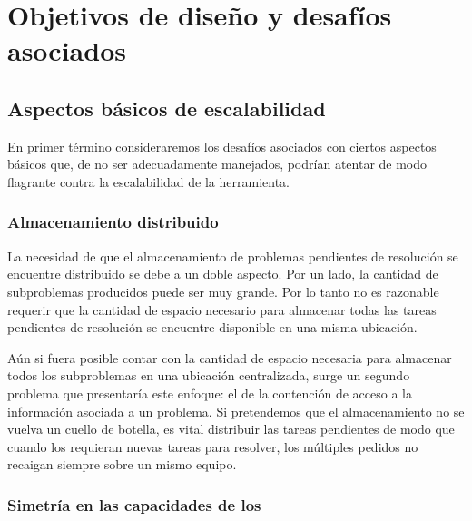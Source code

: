

\section{Objetivos de diseño y desafíos asociados}

\subsection{Aspectos básicos de escalabilidad}

En primer término consideraremos los desafíos asociados con ciertos aspectos
básicos que, de no ser adecuadamente manejados, podrían atentar de modo flagrante
contra la escalabilidad de la herramienta.

\subsubsection{Almacenamiento distribuido}

La necesidad de que el almacenamiento de problemas pendientes de resolución se
encuentre distribuido se debe a un doble aspecto. Por un lado, la cantidad de
subproblemas producidos puede ser muy grande. Por lo tanto no es razonable
requerir que la cantidad de espacio necesario para almacenar todas las tareas
pendientes de resolución se encuentre disponible en una misma ubicación.

Aún si fuera posible contar con la cantidad de espacio necesaria para almacenar
todos los subproblemas en una ubicación centralizada, surge un segundo problema
que presentaría este enfoque: el de la contención de acceso a la información asociada a un problema. 
Si pretendemos que el almacenamiento no se vuelva un cuello de botella, es vital
distribuir las tareas pendientes de modo que cuando los \ws requieran nuevas
tareas para resolver, los múltiples pedidos no recaigan siempre sobre un mismo equipo.


\subsubsection{Simetría en las capacidades de los \ws}

